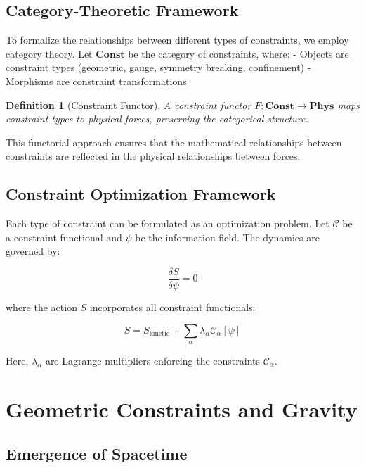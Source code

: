 \documentclass[11pt,a4paper]{article}
\newtheorem{definition}[theorem]{Definition}
\begin{document}
\subsection{Category-Theoretic Framework}

To formalize the relationships between different types of constraints, we employ category theory. Let $\mathbf{Const}$ be the category of constraints, where:
- Objects are constraint types (geometric, gauge, symmetry breaking, confinement)
- Morphisms are constraint transformations

\begin{definition}[Constraint Functor]
A constraint functor $F: \mathbf{Const} \to \mathbf{Phys}$ maps constraint types to physical forces, preserving the categorical structure.
\end{definition}

This functorial approach ensures that the mathematical relationships between constraints are reflected in the physical relationships between forces.

\subsection{Constraint Optimization Framework}

Each type of constraint can be formulated as an optimization problem. Let $\mathcal{C}$ be a constraint functional and $\psi$ be the information field. The dynamics are governed by:

\begin{equation}
\frac{\delta S}{\delta \psi} = 0
\end{equation}

where the action $S$ incorporates all constraint functionals:

\begin{equation}
S = S_{\text{kinetic}} + \sum_{\alpha} \lambda_{\alpha} \mathcal{C}_{\alpha}[\psi]
\end{equation}

Here, $\lambda_{\alpha}$ are Lagrange multipliers enforcing the constraints $\mathcal{C}_{\alpha}$.

\section{Geometric Constraints and Gravity}

\subsection{Emergence of Spacetime}
\end{document}

